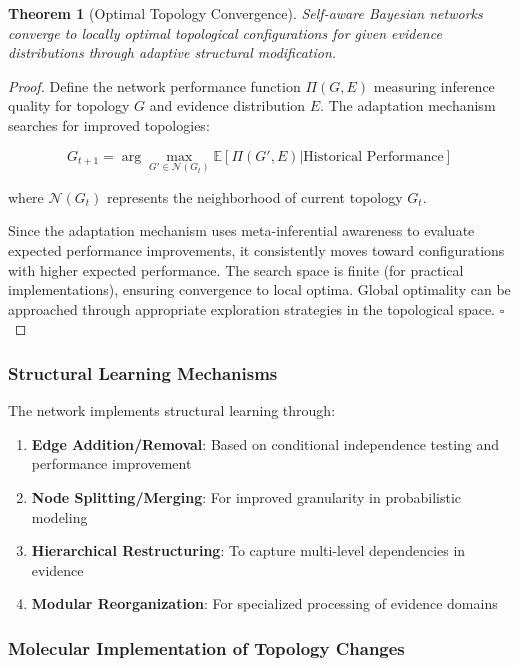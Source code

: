 \documentclass[12pt,a4paper]{article}
\newtheorem{theorem}{Theorem}[section]
\begin{document}
\begin{theorem}[Optimal Topology Convergence]
Self-aware Bayesian networks converge to locally optimal topological configurations for given evidence distributions through adaptive structural modification.
\end{theorem}

\begin{proof}
Define the network performance function $\Pi(G, E)$ measuring inference quality for topology $G$ and evidence distribution $E$. The adaptation mechanism searches for improved topologies:

\begin{equation}
G_{t+1} = \arg\max_{G' \in \mathcal{N}(G_t)} \mathbb{E}[\Pi(G', E) | \text{Historical Performance}]
\end{equation}

where $\mathcal{N}(G_t)$ represents the neighborhood of current topology $G_t$.

Since the adaptation mechanism uses meta-inferential awareness to evaluate expected performance improvements, it consistently moves toward configurations with higher expected performance. The search space is finite (for practical implementations), ensuring convergence to local optima. Global optimality can be approached through appropriate exploration strategies in the topological space. $\square$
\end{proof}

\subsubsection{Structural Learning Mechanisms}

The network implements structural learning through:

\begin{enumerate}
\item \textbf{Edge Addition/Removal}: Based on conditional independence testing and performance improvement
\item \textbf{Node Splitting/Merging}: For improved granularity in probabilistic modeling
\item \textbf{Hierarchical Restructuring}: To capture multi-level dependencies in evidence
\item \textbf{Modular Reorganization}: For specialized processing of evidence domains
\end{enumerate}

\subsubsection{Molecular Implementation of Topology Changes}
\end{document}
